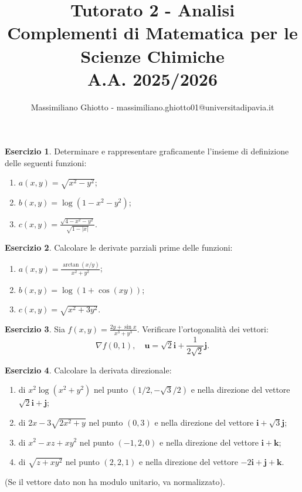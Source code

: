 \documentclass[12pt,a4paper]{article}
\title{Tutorato 2 - Analisi\\Complementi di Matematica per le Scienze Chimiche\\ A.A. 2025/2026}
\author{Massimiliano Ghiotto - massimiliano.ghiotto01@universitadipavia.it}
\date{}
\theoremstyle{definition}
\newtheorem{exe}{Esercizio}
\begin{document}
\maketitle

\begin{exe}
    Determinare e rappresentare graficamente l'insieme di definizione delle seguenti funzioni:
    \begin{enumerate}
        \item $a(x,y) = \sqrt{x^2 - y^2}$;
        \item $b(x,y) = \log(1 - x^2 - y^2)$;
        \item $c(x,y) = \frac{\sqrt{4 - x^2 - y^2}}{\sqrt{1 - |x|}}$.
    \end{enumerate}
\end{exe}

\begin{exe}
    Calcolare le derivate parziali prime delle funzioni:
    \begin{enumerate}
        \item $a(x,y) = \frac{\arctan(x/y)}{x^2 + y^2}$;
        \item $b(x,y) = \log(1 + \cos(xy))$;
        \item $c(x,y) = \sqrt{x^2 + 3y^2}$.
    \end{enumerate}
\end{exe}

\begin{exe}
    Sia $f(x,y) = \frac{2y + \sin x}{x^3 + y^3}$. Verificare l'ortogonalità dei vettori:
    \[ \nabla f(0,1), \quad \mathbf{u} = \sqrt{2}\mathbf{i} + \frac{1}{2\sqrt{2}}\mathbf{j}. \]
\end{exe}

\begin{exe}
    Calcolare la derivata direzionale:
    \begin{enumerate}
        \item di $x^2 \log(x^2+y^2)$ nel punto $(1/2, -\sqrt{3}/2)$ e nella direzione del vettore $\sqrt{2}\mathbf{i} + \mathbf{j}$;
        \item di $2x - 3\sqrt{2x^2+y}$ nel punto $(0,3)$ e nella direzione del vettore $\mathbf{i} + \sqrt{3}\mathbf{j}$;
        \item di $x^2 - xz + xy^2$ nel punto $(-1,2,0)$ e nella direzione del vettore $\mathbf{i} + \mathbf{k}$;
        \item di $\sqrt{z + xy^2}$ nel punto $(2,2,1)$ e nella direzione del vettore $-2\mathbf{i} + \mathbf{j} + \mathbf{k}$.
    \end{enumerate}
    (Se il vettore dato non ha modulo unitario, va normalizzato).
\end{exe}
\end{document}
